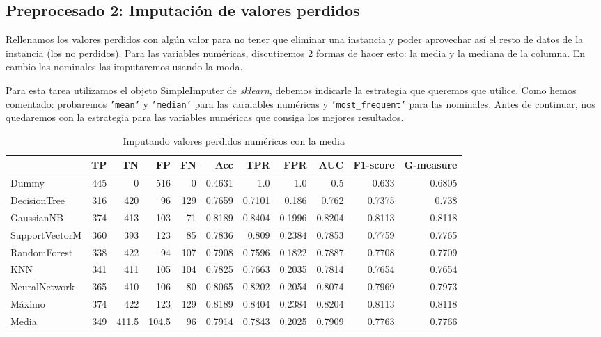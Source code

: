 \documentclass{article}
\begin{document}
\subsection{Preprocesado 2: Imputación de valores perdidos}

Rellenamos los valores perdidos con algún valor para no tener que
eliminar una instancia y poder aprovechar así el resto de datos de la
instancia (los no perdidos). Para las variables numéricas,
discutiremos 2 formas de hacer esto: la media y la mediana de la
columna. En cambio las nominales las imputaremos usando la moda.

Para esta tarea utilizamos el objeto SimpleImputer de
\textit{sklearn}, debemos indicarle la estrategia que queremos que
utilice. Como hemos comentado: probaremos \texttt{'mean'} y
\texttt{'median'} para las varaiables numéricas y
\texttt{'most\_frequent'} para las nominales. Antes de continuar, nos
quedaremos con la estrategia para las variables numéricas que consiga
los mejores resultados.

\begin{table}[H]
\centering
\caption{Imputando valores perdidos numéricos con la media}
\label{tab:impute-mean}
\begin{tabular}{|lrrrrrrrrrr|}
\hline
 & TP & TN & FP & FN & Acc & TPR & FPR & AUC & F1-score & G-measure\\ \hline
Dummy & 445 & 0 & 516 & 0 & 0.4631 & 1.0 & 1.0 & 0.5 & 0.633 & 0.6805\\
DecisionTree & 316 & 420 & 96 & 129 & 0.7659 & 0.7101 & 0.186 & 0.762 & 0.7375 & 0.738\\
GaussianNB & 374 & 413 & 103 & 71 & 0.8189 & 0.8404 & 0.1996 & 0.8204 & 0.8113 & 0.8118\\
SupportVectorM & 360 & 393 & 123 & 85 & 0.7836 & 0.809 & 0.2384 & 0.7853 & 0.7759 & 0.7765\\
RandomForest & 338 & 422 & 94 & 107 & 0.7908 & 0.7596 & 0.1822 & 0.7887 & 0.7708 & 0.7709\\
KNN & 341 & 411 & 105 & 104 & 0.7825 & 0.7663 & 0.2035 & 0.7814 & 0.7654 & 0.7654\\
NeuralNetwork & 365 & 410 & 106 & 80 & 0.8065 & 0.8202 & 0.2054 & 0.8074 & 0.7969 & 0.7973\\ \hline
Máximo & 374 & 422 & 123 & 129 & 0.8189 & 0.8404 & 0.2384 & 0.8204 & 0.8113 & 0.8118\\
Media & 349 & 411.5 & 104.5 & 96 & 0.7914 & 0.7843 & 0.2025 & 0.7909 & 0.7763 & 0.7766\\
\hline
\end{tabular}
\end{table}
\end{document}
